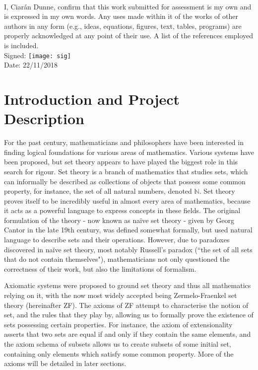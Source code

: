 \documentclass[11pt]{article}
\theoremstyle{definition}
\theoremstyle{theorem}
\theoremstyle{lemma}
\begin{document}
\begin{minipage}[c]{0.9\textwidth}
   \\
  I, Ciarán Dunne, confirm that this work submitted for assessment is my own and is expressed in
  my own words. Any uses made within it of the works of other authors in any form (e.g.,
  ideas, equations, figures, text, tables, programs) are properly acknowledged at any point of
  their use. A list of the references employed is included.\\
  \vspace{1cm}
  Signed: \texttt{[image: sig]}  \\
  \vspace{1cm}
  Date: 22/11/2018
\end{minipage}
\clearpage



\section{Introduction and Project Description}
For the past century, mathematicians and philosophers have been interested in finding logical foundations for various areas of mathematics. Various systems have been proposed, but set theory appears to have played the biggest role in this search for rigour.
Set theory is a branch of mathematics that studies sets, which can informally be described as collections of objects that possess some common property, for instance, the set of all natural numbers, denoted $\mathbb{N}$.
Set theory proves itself to be incredibly useful in almost every area of mathematics, because it acts as a powerful language to express concepts in these fields.
The original formulation of the theory - now known as na\"ive set theory - given by Georg Cantor in the late 19th century, was defined somewhat formally, but used natural language to describe sets and their operations.
However, due to paradoxes discovered in na\"ive set theory, most notably Russell's paradox (``the set of all sets that do not contain themselves"), mathematicians not only questioned the correctness of their work, but also the limitations of formalism.

Axiomatic systems were proposed to ground set theory and thus all mathematics relying on it, with the now most widely accepted being Zermelo-Fraenkel set theory (hereinafter ZF).
The axioms of ZF attempt to characterise the notion of set, and the rules that they play by, allowing us to formally prove the existence of sets possessing certain properties.
For instance, the axiom of extensionality asserts that two sets are equal if and only if they contain the same elements, and the axiom schema of subsets allows us to create subsets of some initial set, containing only elements which satisfy some common property.
More of the axioms will be detailed in later sections.
\end{document}
